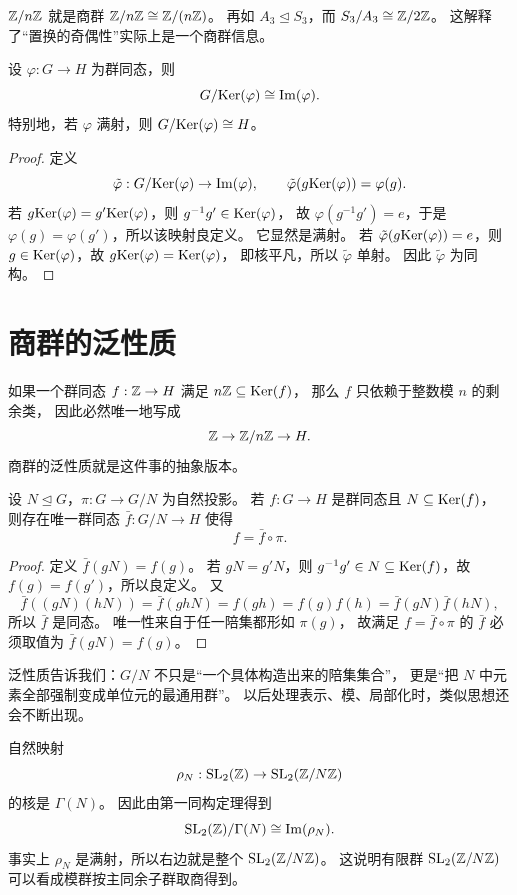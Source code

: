 \begin{example}
$\mathbb{Z}/n\mathbb{Z}$ 就是商群 $\mathbb{Z}/n\mathbb{Z}\cong \mathbb{Z}/(n\mathbb{Z})$。
再如 $A_3\trianglelefteq S_3$，而 $S_3/A_3\cong \mathbb{Z}/2\mathbb{Z}$。
这解释了“置换的奇偶性”实际上是一个商群信息。
\end{example}
\begin{theorem}[第一同构定理]
设 $\varphi:G\to H$ 为群同态，则
\[ G/\mathrm{Ker}(\varphi)\cong \mathrm{Im}(\varphi). \]
特别地，若 $\varphi$ 满射，则 $G/\mathrm{Ker}(\varphi)\cong H$。
\end{theorem}
\begin{proof}
定义
\[ \tilde\varphi:G/\mathrm{Ker}(\varphi)\to \mathrm{Im}(\varphi),\qquad \tilde\varphi(g\mathrm{Ker}(\varphi))=\varphi(g). \]
若 $g\mathrm{Ker}(\varphi)=g'\mathrm{Ker}(\varphi)$，则 $g^{-1}g'\in \mathrm{Ker}(\varphi)$，
故 $\varphi(g^{-1}g')=e$，于是 $\varphi(g)=\varphi(g')$，所以该映射良定义。
它显然是满射。
若 $\tilde\varphi(g\mathrm{Ker}(\varphi))=e$，则 $g\in \mathrm{Ker}(\varphi)$，故 $g\mathrm{Ker}(\varphi)=\mathrm{Ker}(\varphi)$，
即核平凡，所以 $\tilde\varphi$ 单射。
因此 $\tilde\varphi$ 为同构。
\end{proof}
\section{商群的泛性质}
\begin{example}[先看最熟悉的情形]
如果一个群同态 $f:\mathbb{Z}\to H$ 满足 $n\mathbb{Z}\subseteq \mathrm{Ker}(f)$，
那么 $f$ 只依赖于整数模 $n$ 的剩余类，
因此必然唯一地写成
\[ \mathbb{Z}\to \mathbb{Z}/n\mathbb{Z}\to H. \]
商群的泛性质就是这件事的抽象版本。
\end{example}
\begin{proposition}[商群的泛性质]
设 $N\trianglelefteq G$，$\pi:G\to G/N$ 为自然投影。
若 $f:G\to H$ 是群同态且 $N\subseteq \mathrm{Ker}(f)$，
则存在唯一群同态 $\bar f:G/N\to H$ 使得
\[ f=\bar f\circ \pi. \]
\end{proposition}
\begin{proof}
定义 $\bar f(gN)=f(g)$。
若 $gN=g'N$，则 $g^{-1}g'\in N\subseteq \mathrm{Ker}(f)$，故 $f(g)=f(g')$，所以良定义。
又
\[ \bar f((gN)(hN))=\bar f(ghN)=f(gh)=f(g)f(h)=\bar f(gN)\bar f(hN), \]
所以 $\bar f$ 是同态。
唯一性来自于任一陪集都形如 $\pi(g)$，
故满足 $f=\bar f\circ\pi$ 的 $\bar f$ 必须取值为 $\bar f(gN)=f(g)$。
\end{proof}
\begin{remark}
泛性质告诉我们：$G/N$ 不只是“一个具体构造出来的陪集集合”，
更是“把 $N$ 中元素全部强制变成单位元的最通用群”。
以后处理表示、模、局部化时，类似思想还会不断出现。
\end{remark}
\begin{example}[模 $N$ 约化的群论来源]
自然映射
\[ \rho_N:\mathrm{SL}_2(\mathbb{Z})\to \mathrm{SL}_2(\mathbb{Z}/N\mathbb{Z}) \]
的核是 $\Gamma(N)$。
因此由第一同构定理得到
\[ \mathrm{SL}_2(\mathbb{Z})/\Gamma(N)\cong \mathrm{Im}(\rho_N). \]
事实上 $\rho_N$ 是满射，所以右边就是整个 $\mathrm{SL}_2(\mathbb{Z}/N\mathbb{Z})$。
这说明有限群 $\mathrm{SL}_2(\mathbb{Z}/N\mathbb{Z})$ 可以看成模群按主同余子群取商得到。
\end{example}
